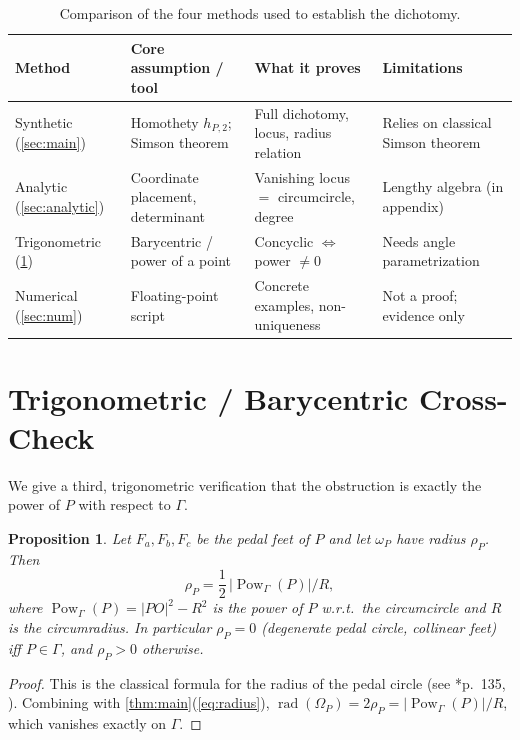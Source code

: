 \documentclass[11pt,a4paper]{article}
\newtheorem{proposition}[theorem]{Proposition}
\theoremstyle{definition}
\newcommand{\Fa}{F_{a}}
\newcommand{\Fb}{F_{b}}
\newcommand{\Fc}{F_{c}}
\newcommand{\circc}{\Gamma}
\newcommand{\pedalc}{\omega_{P}}
\newcommand{\reflc}{\Omega_{P}}
\begin{document}
\begin{table}[h]
\centering
\caption{Comparison of the four methods used to establish the dichotomy.}
\label{tab:methods}
\begin{tabular}{p{2.2cm}p{3.2cm}p{3.2cm}p{3.2cm}}
\toprule
Method & Core assumption / tool & What it proves & Limitations \\
\midrule
Synthetic (\cref{sec:main}) & Homothety $h_{P,2}$; Simson theorem & Full dichotomy, locus, radius relation & Relies on classical Simson theorem \\
Analytic (\cref{sec:analytic}) & Coordinate placement, determinant & Vanishing locus $=$ circumcircle, degree & Lengthy algebra (in appendix) \\
Trigonometric (\cref{sec:trig}) & Barycentric / power of a point & Concyclic $\iff$ power $\neq0$ & Needs angle parametrization \\
Numerical (\cref{sec:num}) & Floating-point script & Concrete examples, non-uniqueness & Not a proof; evidence only \\
\bottomrule
\end{tabular}
\end{table}

\section{Trigonometric / Barycentric Cross-Check}\label{sec:trig}

We give a third, trigonometric verification that the obstruction is exactly the power of $P$ with respect to $\circc$.

\begin{proposition}\label{prop:trig}
Let $\Fa,\Fb,\Fc$ be the pedal feet of $P$ and let $\pedalc$ have radius $\rho_{P}$. Then
\begin{equation}\label{eq:pedal-radius}
\rho_{P}=\frac{1}{2}\,\bigl|\operatorname{Pow}_{\circc}(P)\bigr|/R,
\end{equation}
where $\operatorname{Pow}_{\circc}(P)=|PO|^{2}-R^{2}$ is the power of $P$ w.r.t.\ the circumcircle and $R$ is the circumradius. In particular $\rho_{P}=0$ (degenerate pedal circle, collinear feet) iff $P\in\circc$, and $\rho_{P}>0$ otherwise.
\end{proposition}
\begin{proof}
This is the classical formula for the radius of the pedal circle (see \cite{Johnson}*{p.~135}, \cite{Altshiller}). Combining with \cref{thm:main}(\ref{eq:radius}), $\operatorname{rad}(\reflc)=2\rho_{P}=|\operatorname{Pow}_{\circc}(P)|/R$, which vanishes exactly on $\circc$.
\end{proof}
\end{document}
